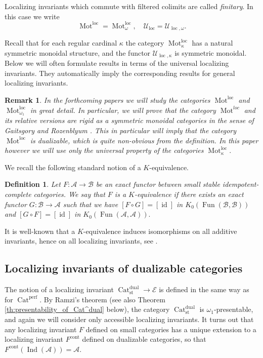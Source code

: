 \documentclass[11pt,leqno]{amsart}
\newtheorem{defi}[theo]{Definition}
\newtheorem{remark}[theo]{Remark}
\numberwithin{equation}{section}
\newcommand{\Mot}{\operatorname{Mot}}
\newcommand{\Cat}{\operatorname{Cat}}
\newcommand{\loc}{\operatorname{loc}}
\newcommand{\cont}{\operatorname{cont}}
\newcommand{\st}{\operatorname{st}}
\newcommand{\dual}{\operatorname{dual}}
\newcommand{\cA}{{\mathcal A}}
\newcommand{\cB}{{\mathcal B}}
\newcommand{\cE}{{\mathcal E}}
\newcommand{\cU}{{\mathcal U}}
\newcommand{\Fun}{\operatorname{Fun}}
\newcommand{\perf}{\operatorname{perf}}
\newcommand{\Ind}{\operatorname{Ind}}
\newcommand{\id}{\operatorname{id}}
\begin{document}
Localizing invariants which commute with filtered colimits are called {\it finitary}. In this case we write $$\Mot^{\loc}=\Mot^{\loc}_{\omega},\quad \cU_{\loc}=\cU_{\loc,\omega}.$$

Recall that for each regular cardinal $\kappa$ the category $\Mot^{\loc}_{\kappa}$ has a natural symmetric monoidal structure, and the functor $\cU_{\loc,\kappa}$ is symmetric monoidal. Below we will often formulate results in terms of the universal localizing invariants. They automatically imply the corresponding results for general localizing invariants.

\begin{remark} In the forthcoming papers \cite{E1, E2} we will study the categories $\Mot^{\loc}$ and $\Mot^{\loc}_{\omega_1}$ in great detail. In particular, we will prove that the category $\Mot^{loc}$ and its relative versions are rigid as a symmetric monoidal categories in the sense of Gaitsgory and Rozenblyum \cite[Definition 9.1.2]{GaRo17}. This in particular will imply that the category $\Mot^{\loc}$ is dualizable, which is quite non-obvious from the definition. In this paper however we will use only the universal property of the categories $\Mot^{\loc}_{\kappa}.$\end{remark}
 
We recall the following standard notion of a $K$-equivalence.

\begin{defi}\label{defi:K-equivalence} Let $F:\cA\to\cB$ be an exact functor between small stable idempotent-complete categories. We say that $F$ is a $K$-equivalence if there exists an exact functor $G:\cB\to\cA$ such that we have $[F\circ G]=[\id]$ in $K_0(\Fun(\cB,\cB))$ and $[G\circ F]=[\id]$ in $K_0(\Fun(\cA,\cA)).$\end{defi}
 
It is well-known that a $K$-equivalence induces isomorphisms on all additive invariants, hence on all localizing invariants, see \cite{BGT}. 

\subsection{Localizing invariants of dualizable categories}
\label{ssec:loc_invar_dualizable}

The notion of a localizing invariant $\Cat_{\st}^{\dual}\to\cE$ is defined in the same way as for $\Cat^{\perf}.$ By Ramzi's theorem \cite{Ram24a} (see also Theorem \ref{th:presentability_of_Cat^dual} below), the category $\Cat_{\st}^{\dual}$ is $\omega_1$-presentable, and again we will consider only accessible localizing invariants. It turns out that any localizing invariant $F$ defined on small categories has a unique extension to a localizing invariant $F^{\cont}$ defined on dualizable categories, so that $F^{\cont}(\Ind(\cA))=\cA.$ 
\end{document}
